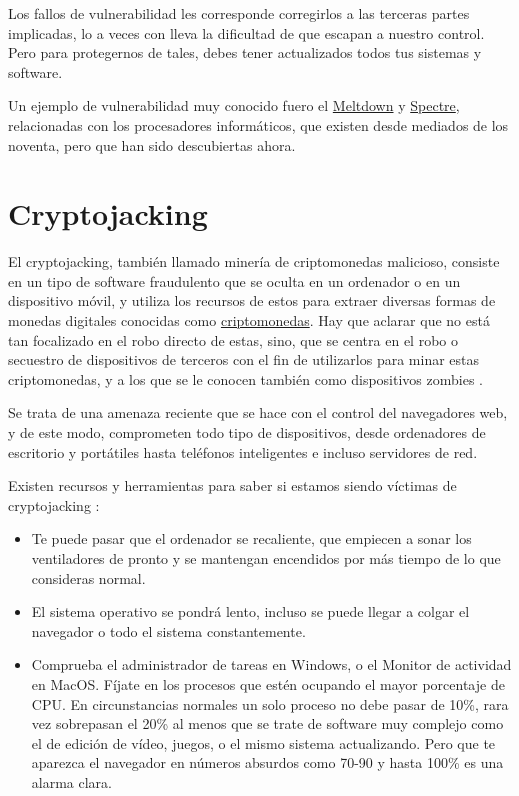 \documentclass[
  spanish,
  a4paper,
  openany]{book}
\begin{document}
Los fallos de vulnerabilidad les corresponde corregirlos a las terceras partes implicadas, lo a veces con lleva la dificultad de que escapan a nuestro control. Pero para protegernos de tales, debes tener actualizados todos tus sistemas y software.

Un ejemplo de vulnerabilidad muy conocido fuero el \href{https://es.wikipedia.org/wiki/Meltdown_(vulnerabilidad)}{Meltdown} y \href{https://es.wikipedia.org/wiki/Spectre_(vulnerabilidad)}{Spectre}, relacionadas con los procesadores informáticos, que existen desde mediados de los noventa, pero que han sido descubiertas ahora.

\hypertarget{cryptojacking}{%
\section{Cryptojacking}\label{cryptojacking}}

El cryptojacking, también llamado minería de criptomonedas malicioso, consiste en un tipo de software fraudulento que se oculta en un ordenador o en un dispositivo móvil, y utiliza los recursos de estos para extraer diversas formas de monedas digitales conocidas como \href{https://es.wikipedia.org/wiki/Criptomoneda}{criptomonedas}. Hay que aclarar que no está tan focalizado en el robo directo de estas, sino, que se centra en el robo o secuestro de dispositivos de terceros con el fin de utilizarlos para minar estas criptomonedas, y a los que se le conocen también como dispositivos zombies \citep{cryptojacking}.

Se trata de una amenaza reciente que se hace con el control del navegadores web, y de este modo, comprometen todo tipo de dispositivos, desde ordenadores de escritorio y portátiles hasta teléfonos inteligentes e incluso servidores de red.

Existen recursos y herramientas para saber si estamos siendo víctimas de cryptojacking \citep{GEN-guia-cryptojacking}:

\begin{itemize}
\item
  Te puede pasar que el ordenador se recaliente, que empiecen a sonar los ventiladores de pronto y se mantengan encendidos por más tiempo de lo que consideras normal.
\item
  El sistema operativo se pondrá lento, incluso se puede llegar a colgar el navegador o todo el sistema constantemente.
\item
  Comprueba el administrador de tareas en Windows, o el Monitor de actividad en MacOS. Fíjate en los procesos que estén ocupando el mayor porcentaje de CPU. En circunstancias normales un solo proceso no debe pasar de 10\%, rara vez sobrepasan el 20\% al menos que se trate de software muy complejo como el de edición de vídeo, juegos, o el mismo sistema actualizando. Pero que te aparezca el navegador en números absurdos como 70-90 y hasta 100\% es una alarma clara.
\end{itemize}
\end{document}
